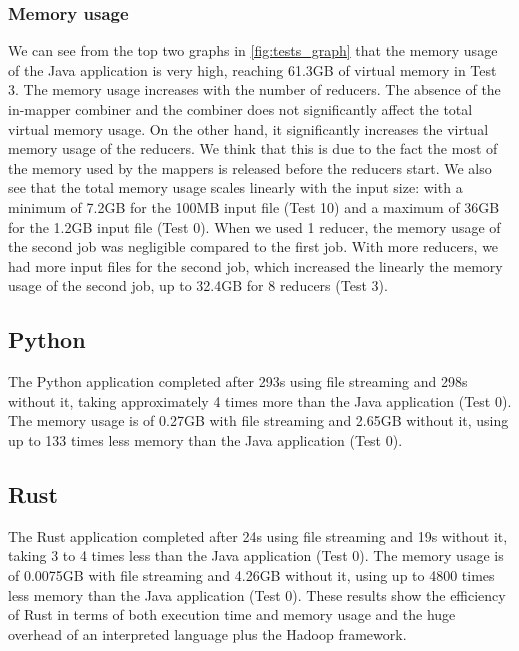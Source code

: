 \documentclass{article}
\begin{document}
\begin{multicols}{2}
        \subsubsection{Memory usage}
            We can see from the top two graphs in \autoref{fig:tests_graph} that the memory usage of the Java
            application is very high, reaching 61.3GB of virtual memory in Test 3.
            The memory usage increases with the number of reducers. 
            The absence of the in-mapper combiner and the combiner does not significantly affect the 
            total virtual memory usage. On the other hand, it significantly increases the virtual memory 
            usage of the reducers. 
            We think that this is due to the fact the most of the memory used by the mappers is released
            before the reducers start.
            We also see that the total memory usage scales linearly with the input size: with a minimum of
            7.2GB for the 100MB input file (Test 10) and a maximum of 36GB for the 1.2GB input file (Test 0).
            When we used 1 reducer, the memory usage of the second job was negligible compared to the first job.
            With more reducers, we had more input files for the second job, which increased the linearly
            the memory usage of the second job, up to 32.4GB for 8 reducers (Test 3).
    \subsection{Python}
        The Python application completed after 293s using file streaming and 298s without it, 
        taking approximately 4 times more than the Java application (Test 0).
        The memory usage is of 0.27GB with file streaming and 2.65GB without it, using up to 
        133 times less memory than the Java application (Test 0).
    \subsection{Rust}
        The Rust application completed after 24s using file streaming and 19s without it, taking
        3 to 4 times less than the Java application (Test 0).
        The memory usage is of 0.0075GB with file streaming and 4.26GB without it, using up to
        4800 times less memory than the Java application (Test 0).
        These results show the efficiency of Rust in terms of both execution time and memory usage and
        the huge overhead of an interpreted language plus the Hadoop framework.

\end{multicols}
\end{document}
